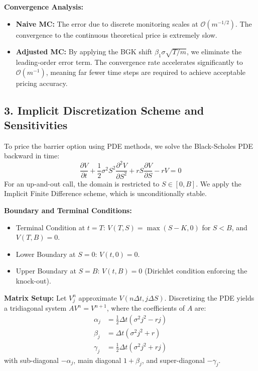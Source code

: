 \textbf{Convergence Analysis:}
\begin{itemize}
    \item \textbf{Naive MC:} The error due to discrete monitoring scales at $\mathcal{O}(m^{-1/2})$. The convergence to the continuous theoretical price is extremely slow.
    \item \textbf{Adjusted MC:} By applying the BGK shift $\beta_1 \sigma \sqrt{T/m}$, we eliminate the leading-order error term. The convergence rate accelerates significantly to $\mathcal{O}(m^{-1})$, meaning far fewer time steps are required to achieve acceptable pricing accuracy.
\end{itemize}

\subsection*{3. Implicit Discretization Scheme and Sensitivities}

To price the barrier option using PDE methods, we solve the Black-Scholes PDE backward in time:
\begin{equation}
    \frac{\partial V}{\partial t} + \frac{1}{2}\sigma^2 S^2 \frac{\partial^2 V}{\partial S^2} + rS \frac{\partial V}{\partial S} - rV = 0
\end{equation}
For an up-and-out call, the domain is restricted to $S \in [0, B]$. We apply the Implicit Finite Difference scheme, which is unconditionally stable.

\textbf{Boundary and Terminal Conditions:}
\begin{itemize}
    \item Terminal Condition at $t=T$: $V(T, S) = \max(S - K, 0)$ for $S < B$, and $V(T, B) = 0$.
    \item Lower Boundary at $S=0$: $V(t, 0) = 0$.
    \item Upper Boundary at $S=B$: $V(t, B) = 0$ (Dirichlet condition enforcing the knock-out).
\end{itemize}

\textbf{Matrix Setup:} Let $V_j^n$ approximate $V(n\Delta t, j\Delta S)$. Discretizing the PDE yields a tridiagonal system $A V^{n} = V^{n+1}$, where the coefficients of $A$ are:
\begin{align*}
    \alpha_j &= \frac{1}{2} \Delta t (\sigma^2 j^2 - r j) \\
    \beta_j  &= \Delta t (\sigma^2 j^2 + r) \\
    \gamma_j &= \frac{1}{2} \Delta t (\sigma^2 j^2 + r j)
\end{align*}
with sub-diagonal $-\alpha_j$, main diagonal $1 + \beta_j$, and super-diagonal $-\gamma_j$.

